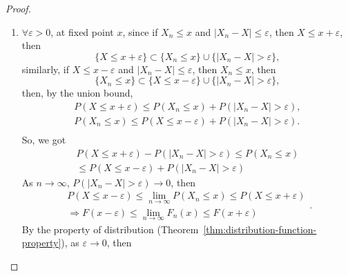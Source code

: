 \begin{proof}
	\begin{enumerate}
		\item $\forall\varepsilon>0$, at fixed point $x$, since if $X_n\leq x$ and $|X_n-X|\leq\varepsilon$, then $X\leq x+\varepsilon$, then
		      \begin{equation*}
			      \{X\leq x+\varepsilon\}\subset\{X_n\leq x\}\cup\{|X_n-X|>\varepsilon\},
		      \end{equation*}
		      similarly, if $X\leq x-\varepsilon$ and $|X_n-X|\leq\varepsilon$, then $X_n\leq x$, then
		      \begin{equation*}
			      \{X_n\leq x\}\subset\{X\leq x-\varepsilon\}\cup\{|X_n-X|>\varepsilon\},
		      \end{equation*}
		      then, by the union bound,
		      \begin{equation*}
			      \begin{gathered}
				      P\left(X\leq x+\varepsilon\right)\leq P\left(X_n\leq x\right)+P\left(|X_n-X|>\varepsilon\right),\\
				      P\left(X_n\leq x\right)\leq P\left(X\leq x-\varepsilon\right)+P\left(|X_n-X|>\varepsilon\right).\\
			      \end{gathered}
		      \end{equation*}
		      So, we got
		      \begin{equation*}
			      \begin{gathered}
				      P\left(X\leq x+\varepsilon\right)-P\left(|X_n-X|>\varepsilon\right)\leq P\left(X_n\leq x\right) \\
				      \leq P\left(X\leq x-\varepsilon\right)+P\left(|X_n-X|>\varepsilon\right)
			      \end{gathered}
		      \end{equation*}
		      As $n\rightarrow\infty$, $P\left(|X_n-X|>\varepsilon\right)\rightarrow 0$, then
		      \begin{equation*}
			      \begin{gathered}
				      P\left(X\leq x-\varepsilon\right)\leq\lim_{n\rightarrow\infty}P\left(X_n\leq x\right)\leq P\left(X\leq x+\varepsilon\right) \\
				      \Rightarrow F(x-\varepsilon)\leq \lim_{n\rightarrow\infty}F_n(x)\leq F(x+\varepsilon)
			      \end{gathered}.
		      \end{equation*}
		      By the property of distribution (Theorem~\ref{thm:distribution-function-property}), as $\varepsilon\rightarrow 0$, then

\end{enumerate}
\end{proof}
